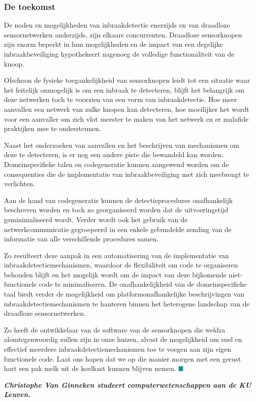 \documentclass[DIV=calc,paper=a4,fontsize=11pt,twocolumn]{scrartcl}
\newcommand{\heading}[1]{
\vspace{-5mm}
\subsubsection*{#1}
\vspace{-2mm}
}
\begin{document}
\heading{De toekomst}

De noden en mogelijkheden van inbraakdetectie enerzijds en van draadloze
sensornetwerken anderzijds, zijn elkaars concurrenten. Draadloze sensorknopen
zijn enorm beperkt in hun mogelijkheden en de impact van een degelijke
inbraakbeveiliging hypothekeert nagenoeg de volledige functionaliteit van de
knoop.

Ofschoon de fysieke toegankelijkheid van sensorknopen leidt tot een situatie
waar het feitelijk onmogelijk is om een inbraak te detecteren, blijft het
belangrijk om deze netwerken toch te voorzien van een vorm van inbraakdetectie.
Hoe meer aanvallen een netwerk van zulke knopen kan detecteren, hoe moeilijker
het wordt voor een aanvaller om zich vlot meester te maken van het netwerk en
er malafide praktijken mee te ondersteunen.

Naast het onderzoeken van aanvallen en het beschrijven van mechanismen om deze
te detecteren, is er nog een andere piste die bewandeld kan worden.
Domeinspecifieke talen en codegeneratie kunnen aangewend worden om de
consequenties die de implementatie van inbraakbeveiliging met zich meebrengt te
verlichten.

Aan de hand van codegeneratie kunnen de detectieprocedures onafhankelijk
beschreven worden en toch zo georganiseerd worden dat de uitvoeringstijd
geminimaliseerd wordt. Verder wordt ook het gebruik van de netwerkcommunicatie
gegroepeerd in een enkele gebundelde zending van de informatie van alle
verschillende procedures samen.

Zo resulteert deze aanpak in een automatisering van de implementatie van
inbraakdetectiemechanismen, waardoor de flexibiliteit om code te organiseren
behouden blijft en het mogelijk wordt om de impact van deze bijkomende
niet-functionele code te minimaliseren. De onafhankelijkheid van de
domeinspecifieke taal biedt verder de mogelijkheid om platformonafhankelijke
beschrijvingen van inbraakdetectiemechanismen te hanteren binnen het heterogene
landschap van de draadloze sensornetwerken.

Zo heeft de ontwikkelaar van de software van de sensorknopen die weldra
alomtegenwoordig zullen zijn in onze huizen, alvast de mogelijkheid om snel en
effectief meerdere inbraakdetectiemechanismen toe te voegen aan zijn eigen
functionele code. Laat ons hopen dat we op die manier morgen met een gerust
hart een pak melk uit de koelkast kunnen blijven nemen.
$\color{BaseColor}\blacksquare$

\vspace{0.3cm}

\noindent\bf{\emph{Christophe Van Ginneken studeert computerwetenschappen aan de KU
Leuven.}}
\end{document}
